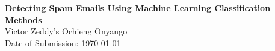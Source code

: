 \begin{titlepage}
    \begin{center}
        \vspace*{1.5cm}
        \textbf{Detecting Spam Emails Using Machine Learning Classification Methods}
        \vspace{14.0cm}
        \\Victor Zeddy's Ochieng Onyango
        \\Date of Submission: \today
    \end{center}
\end{titlepage}